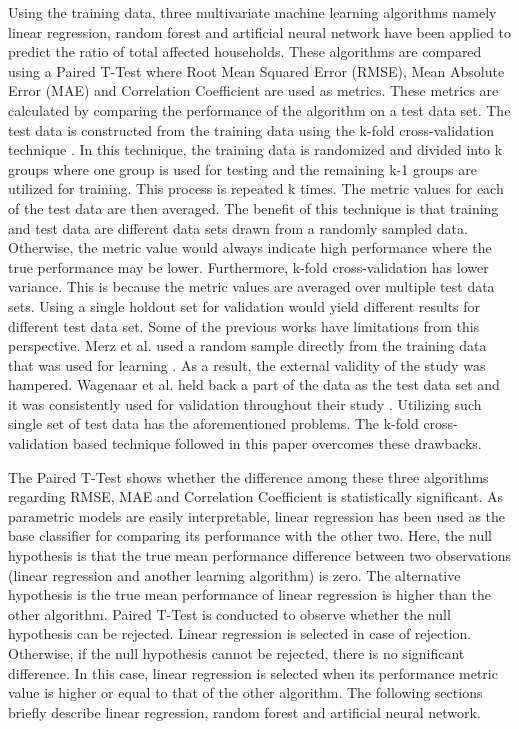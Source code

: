\documentclass[preprint,review,12pt]{elsarticle}
\begin{document}
Using the training data, three multivariate machine learning algorithms namely linear regression, random forest and artificial neural network have been applied to predict the ratio of total affected households. These algorithms are compared using a Paired T-Test where Root Mean Squared Error (RMSE), Mean Absolute Error (MAE) and Correlation Coefficient are used as metrics. These metrics are calculated by comparing the performance of the algorithm on a test data set. The test data is constructed from the training data using the k-fold cross-validation technique \cite{mosteller1968data}. In this technique, the training data is randomized and divided into k groups where one group is used for testing and the remaining k-1 groups are utilized for training. This process is repeated k times. The metric values for each of the test data are then averaged. The benefit of this technique is that training and test data are different data sets drawn from a randomly sampled data. Otherwise, the metric value would always indicate high performance where the true performance may be lower. Furthermore, k-fold cross-validation has lower variance. This is because the metric values are averaged over multiple test data sets. Using a single holdout set for validation would yield different results for different test data set. Some of the previous works have limitations from this perspective. Merz et al. used a random sample directly from the training data that was used for learning \cite{merz2013multi}. As a result, the external validity of the study was hampered. Wagenaar et al. held back a part of the data as the test data set and it was consistently used for validation throughout their study \cite{wagenaar2017multi}. Utilizing such single set of test data has the aforementioned problems. The k-fold cross-validation based technique followed in this paper overcomes these drawbacks.

The Paired T-Test shows whether the difference among these three algorithms regarding RMSE, MAE and Correlation Coefficient is statistically significant. As parametric models are easily interpretable, linear regression has been used as the base classifier for comparing its performance with the other two. Here, the null hypothesis is that the true mean performance difference between two observations (linear regression and another learning algorithm) is zero. The alternative hypothesis is the true mean performance of linear regression is higher than the other algorithm. Paired T-Test is conducted to observe whether the null hypothesis can be rejected. Linear regression is selected in case of rejection. Otherwise, if the null hypothesis cannot be rejected, there is no significant difference. In this case, linear regression is selected when its performance metric value is higher or equal to that of the other algorithm. The following sections briefly describe linear regression, random forest and artificial neural network.
\end{document}
